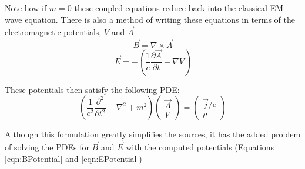 \documentclass{article}
\begin{document}
Note how if $m=0$ these coupled equations reduce back into the classical EM wave equation. There is also a method of writing these equations in terms of the electromagnetic potentials, $V$ and $\vec A$
\begin{equation}
\vec B = \nabla\times\vec A
\label{eqn:BPotential}
\end{equation}
\begin{equation}
\vec E = -\left(\frac{1}{c}\frac{\partial\vec A}{\partial t} + \nabla V\right)
\label{eqn:EPotential}
\end{equation}

These potentials then satisfy the following PDE:
\begin{equation}
\boxed{
\left(\frac{1}{c^2}\frac{\partial^2}{\partial t^2} - \nabla^2 + m^2\right)	
\begin{pmatrix}
\vec A \\
V
\end{pmatrix}
=
\begin{pmatrix}
\vec j / c \\
\rho
\end{pmatrix}
}
\end{equation}

Although this formulation greatly simplifies the sources, it has the added problem of solving the PDEs for $\vec B$ and $\vec E$ with the computed potentials (Equations \ref{eqn:BPotential} and \ref{eqn:EPotential})
\end{document}
